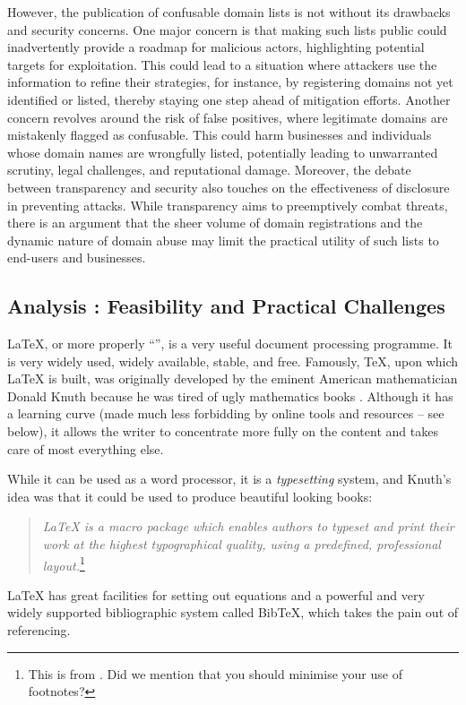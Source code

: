 However, the publication of confusable domain lists is not without its drawbacks and security concerns. One major concern is that making such lists public could inadvertently provide a roadmap for malicious actors, highlighting potential targets for exploitation. This could lead to a situation where attackers use the information to refine their strategies, for instance, by registering domains not yet identified or listed, thereby staying one step ahead of mitigation efforts. Another concern revolves around the risk of false positives, where legitimate domains are mistakenly flagged as confusable. This could harm businesses and individuals whose domain names are wrongfully listed, potentially leading to unwarranted scrutiny, legal challenges, and reputational damage. Moreover, the debate between transparency and security also touches on the effectiveness of disclosure in preventing attacks. While transparency aims to preemptively combat threats, there is an argument that the sheer volume of domain registrations and the dynamic nature of domain abuse may limit the practical utility of such lists to end-users and businesses.

\subsection{ Analysis : Feasibility and Practical Challenges}



\label{latexchapter}
\LaTeX{}, or more properly ``\LaTeXe{}'', is a very useful document processing programme. It is very widely used, widely available, stable, and free. Famously, \TeX, upon which \LaTeX{} is built, was originally developed by the eminent American mathematician Donald Knuth because he was tired of ugly mathematics books \cite{shustek2008interview}. Although it has a learning curve (made much less forbidding by online tools and resources -- see below), it allows the writer to concentrate more fully on the content and takes care of most everything else.

While it can be used as a word processor, it is a \emph{typesetting} system, and Knuth's idea was that it could be used to produce beautiful looking books:
\begin{quote}
\emph{\LaTeX{} is a macro package which enables authors to typeset and print their work at the highest typographical quality, using a predefined, professional layout.}\footnote{This is from \cite{oetiker2001not}. Did we mention that you should minimise your use of footnotes?}
\end{quote}
\LaTeX{} has great facilities for setting out equations and a powerful and very widely supported bibliographic system called BibTeX, which takes the pain out of referencing.

